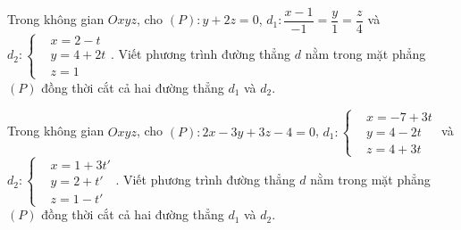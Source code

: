 \setcounter{vd}{0}
\begin{vd}%
	Trong không gian $Oxyz$, cho $(P):y+2z=0$, $d_1:\dfrac{x-1}{-1}=\dfrac{y}{1}=\dfrac{z}{4}$ và\newline $d_2:\left\{\begin{aligned}&x=2-t\\&y=4+2t\\&z=1\end{aligned}\right.$. Viết phương trình đường thẳng $d$ nằm trong mặt phẳng $(P)$ đồng thời cắt cả hai đường thẳng $d_1$ và $d_2$.
\end{vd}
\begin{vd}%
	Trong không gian $Oxyz$, cho $(P):2x-3y+3z-4=0$, $d_1:\left\{\begin{aligned}&x=-7+3t\\&y=4-2t\\&z=4+3t\end{aligned}\right.$ và $d_2:\left\{\begin{aligned}&x=1+3t'\\&y=2+t'\\&z=1-t'\end{aligned}\right.$. Viết phương trình đường thẳng $d$ nằm trong mặt phẳng $(P)$ đồng thời cắt cả hai đường thẳng $d_1$ và $d_2$.
\end{vd}
